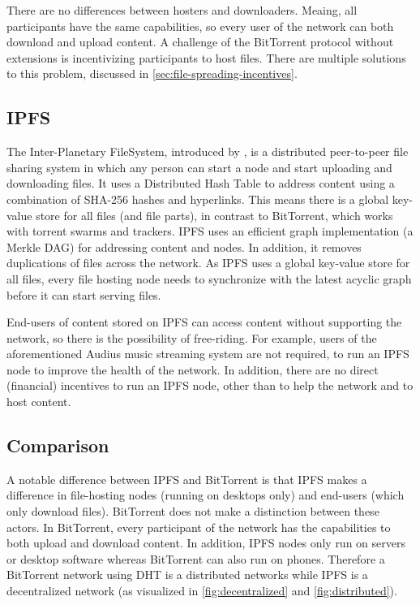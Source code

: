 There are no differences between hosters and downloaders. Meaing, all participants have the same capabilities, so every user of the network can both download and upload content. A challenge of the BitTorrent protocol without extensions is incentivizing participants to host files. There are multiple solutions to this problem, discussed in \ref{sec:file-spreading-incentives}.

\subsection{IPFS}
The Inter-Planetary FileSystem, introduced by \cite{benet2014ipfs}, is a distributed peer-to-peer file sharing system in which any person can start a node and start uploading and downloading files. It uses a Distributed Hash Table to address content using a combination of SHA-256 hashes and hyperlinks. This means there is a global key-value store for all files (and file parts), in contrast to BitTorrent, which works with torrent swarms and trackers. IPFS uses an efficient graph implementation (a Merkle DAG) for addressing content and nodes. In addition, it removes duplications of files across the network. As IPFS uses a global key-value store for all files, every file hosting node needs to synchronize with the latest acyclic graph before it can start serving files.

End-users of content stored on IPFS can access content without supporting the network, so there is the possibility of free-riding. For example, users of the aforementioned Audius music streaming system are not required, to run an IPFS node to improve the health of the network. In addition, there are no direct (financial) incentives to run an IPFS node, other than to help the network and to host content. 

\subsection{Comparison}
A notable difference between IPFS and BitTorrent is that IPFS makes a difference in file-hosting nodes (running on desktops only) and end-users (which only download files). BitTorrent does not make a distinction between these actors. In BitTorrent, every participant of the network has the capabilities to both upload and download content. In addition, IPFS nodes only run on servers or desktop software whereas BitTorrent can also run on phones. Therefore a BitTorrent network using DHT is a distributed networks while IPFS is a decentralized network (as visualized in \ref{fig:decentralized} and \ref{fig:distributed}).

